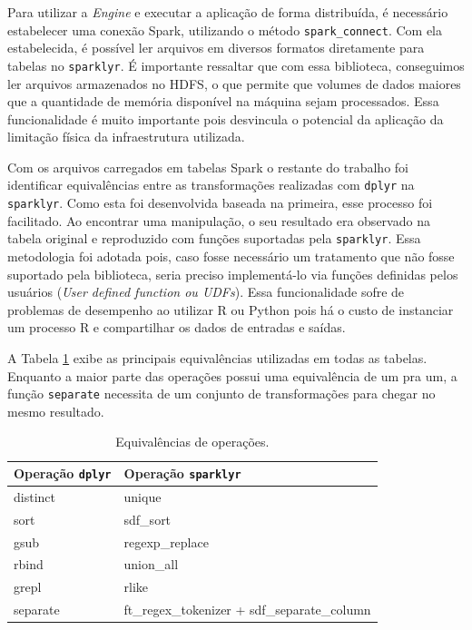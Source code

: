 Para utilizar a \textit{Engine} e executar a aplicação de forma distribuída, é 
necessário estabelecer uma conexão Spark, utilizando o método 
\texttt{spark\_connect}. Com ela estabelecida, é possível ler arquivos em 
diversos formatos diretamente para tabelas no \texttt{sparklyr}. É importante 
ressaltar que com essa biblioteca, conseguimos ler arquivos armazenados no HDFS, 
o que permite que volumes de dados maiores que a quantidade de memória 
disponível na máquina sejam processados. Essa funcionalidade é muito importante 
pois desvincula o potencial da aplicação da limitação física da infraestrutura 
utilizada.

Com os arquivos carregados em tabelas Spark o restante do trabalho 
foi identificar equivalências entre as transformações realizadas com 
\texttt{dplyr} na \texttt{sparklyr}. Como esta foi desenvolvida baseada na 
primeira, esse processo foi facilitado. Ao encontrar uma manipulação, o seu 
resultado era observado na tabela original e reproduzido com funções suportadas 
pela \texttt{sparklyr}. Essa metodologia foi adotada pois, caso fosse necessário 
um tratamento que não fosse suportado pela biblioteca, seria preciso 
implementá-lo via funções definidas pelos usuários (\emph{User defined function 
ou UDFs}). Essa funcionalidade sofre de problemas de desempenho ao utilizar R ou 
Python pois há o custo de instanciar um processo R e compartilhar os dados de 
entradas e saídas. 

A Tabela \ref{tab:equivalence} exibe as principais equivalências utilizadas em 
todas as tabelas. Enquanto a maior parte das operações possui uma equivalência 
de um pra um, a função \texttt{separate} necessita de um conjunto de 
transformações para chegar no mesmo resultado.  

\begin{table}[H]
\centering
\begin{tabular}{l l} \toprule
\textbf{Operação \texttt{dplyr}}  &  \textbf{Operação \texttt{sparklyr}}\\ 
\midrule
distinct	& unique  \\
sort		& sdf\_sort \\
gsub		& regexp\_replace\\
rbind		& union\_all\\
grepl		& rlike\\
separate	& ft\_regex\_tokenizer + sdf\_separate\_column       \\
\end{tabular}
\caption{Equivalências de operações.}
\label{tab:equivalence}
\end{table}

